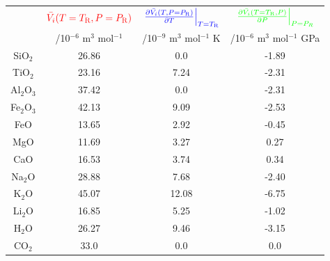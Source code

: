 \documentclass{beamer}
\begin{document}
\begin{frame}
\begin{columns}[t]
\begin{column}{0.7\paperwidth}
      \begin{tabular}{|c|c|c|c|}
        \hline
        & $\textcolor{red}{\bar{V_{i}}(T = T_{\text{R}}, P = P_{\text{R}})}$ & $\textcolor{blue}{\left.\frac{\partial \bar{V_{i}}(T, P = P_{\text{R}})}{\partial T}\right|_{T = T_{\text{R}}}}$ & $\textcolor{green}{\left.\frac{\partial \bar{V_{i}}(T = T_{\text{R}}, P)}{\partial P}\right|_{P = P_{R}}}$ \\
        & /10$^{-6}$ m$^{3}$ mol$^{-1}$ & /10$^{-9}$ m$^{3}$ mol$^{-1}$ K & /10$^{-6}$ m$^{3}$ mol$^{-1}$ GPa \\
        \hline
        SiO$_{2}$ & 26.86 & 0.0 & -1.89 \\
        TiO$_{2}$ & 23.16 & 7.24 & -2.31 \\
        Al$_{2}$O$_{3}$ & 37.42 & 0.0 & -2.31 \\
        Fe$_{2}$O$_{3}$ & 42.13 & 9.09 & -2.53 \\
        FeO & 13.65 & 2.92 & -0.45 \\
        MgO & 11.69 & 3.27 & 0.27 \\
        CaO & 16.53 & 3.74 & 0.34 \\
        Na$_{2}$O & 28.88 & 7.68 & -2.40 \\
        K$_{2}$O & 45.07 & 12.08 & -6.75 \\
        Li$_{2}$O & 16.85 & 5.25 & -1.02 \\
        H$_{2}$O & 26.27 & 9.46 & -3.15 \\
        CO$_{2}$ & 33.0 & 0.0 & 0.0 \\
        \hline
        
      \end{tabular}
    \end{column}

  \end{columns}

\end{frame}
\end{document}
